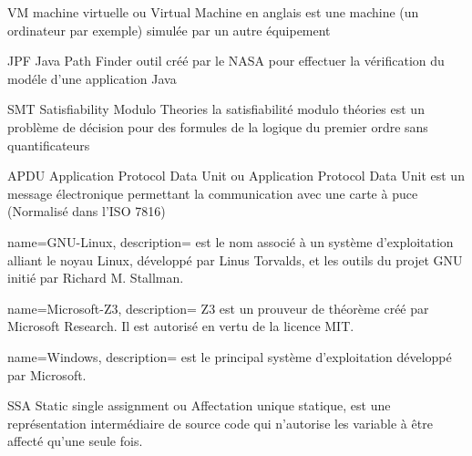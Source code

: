 


    {VM}
    {machine virtuelle}
    { ou Virtual Machine en anglais est une machine (un ordinateur par exemple) simulée par un autre équipement}
    
    {JPF}
    {Java Path Finder}
    { outil créé par le NASA pour effectuer la vérification du modéle d'une application Java}
    
    {SMT}
    {Satisfiability Modulo Theories}
    { la satisfiabilité modulo théories est un problème de décision pour des formules de la logique du premier ordre sans quantificateurs}
    
    {APDU}
    {Application Protocol Data Unit}
    { ou Application Protocol Data Unit est un message électronique permettant la communication avec une carte à puce (Normalisé dans l'ISO 7816)}

{
        name=GNU-Linux,
        description={ est le nom associé à un système d'exploitation alliant le noyau Linux, développé par Linus Torvalds, et les outils du projet GNU initié par Richard M. Stallman.}
}

{
        name=Microsoft-Z3,
        description={ Z3 est un prouveur de théorème créé par Microsoft Research. Il est autorisé en vertu de la licence MIT.}
}

{
        name=Windows,
        description={ est le principal système d'exploitation développé par Microsoft.}
}


	{SSA}
	{Static single assignment}
	{ ou Affectation unique statique, est une représentation intermédiaire de source code qui n'autorise les variable à être affecté qu'une seule fois.}